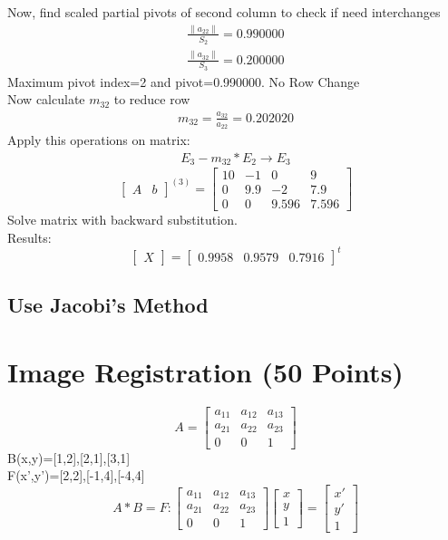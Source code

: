 \documentclass{article}
\begin{document}
Now, find scaled partial pivots of second column to check if need interchanges
\begin{align}
	\frac{\|a_{22}\|}{S_{2}}=0.990000\\
	\frac{\|a_{32}\|}{S_{3}}=0.200000
\end{align}
Maximum pivot index=2 and pivot=0.990000. No Row Change\\
Now calculate $m_{32}$ to reduce row 
\begin{align}
	m_{32}=\frac{a_{32}}{a_{22}}=0.202020
\end{align}
Apply this operations on matrix:
\begin{align}
	E_{3}-m_{32}*E_{2}\rightarrow E_{3}
\end{align}
\[
\left[
\begin{array}{c|c}
A&b
\end{array}
\right]^{(3)}
=
\left[
\begin{array}{ccc|c}
	10&-1&0&9\\
	0&9.9&-2&7.9\\
	0&0&9.596&7.596 
\end{array}
\right]
\]
Solve matrix with backward substitution.\\
Results:
\[
\begin{bmatrix}
X
\end{bmatrix}
=
\begin{bmatrix}
	0.9958&0.9579&0.7916
\end{bmatrix}^t
\]

\subsection{Use Jacobi's Method}
\section{Image Registration (50 Points)}
\[
A=
\begin{bmatrix}
	a_{11}&a_{12}&a_{13}\\
	a_{21}&a_{22}&a_{23}\\
	0&0&1
\end{bmatrix}
\]
B(x,y)={[1,2],[2,1],[3,1]}\\
F(x',y')={[2,2],[-1,4],[-4,4]}\\

\[
A*B=F : 
\begin{bmatrix}
	a_{11}&a_{12}&a_{13}\\
	a_{21}&a_{22}&a_{23}\\
	0&0&1
\end{bmatrix}
\begin{bmatrix}
	x\\y\\1
\end{bmatrix}
=
\begin{bmatrix}
	x'\\y'\\1
\end{bmatrix}
\]
\end{document}
